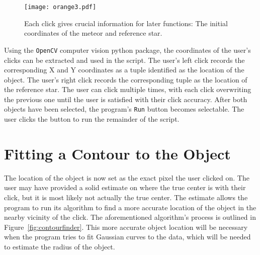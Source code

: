 \begin{figure}[h!]
	\centering
	\texttt{[image: orange3.pdf]}
	\caption{Each click gives crucial information for later functions: The initial coordinates of the meteor and reference star.}
	\label{fig:clickfinder}
\end{figure}

Using the \texttt{OpenCV} computer vision python package, the coordinates of the user's clicks can be extracted and used in the script. The user's left click records the corresponding X and Y coordinates as a tuple identified as the location of the object. The user's right click records the corresponding tuple as the location of the reference star. The user can click multiple times, with each click overwriting the previous one until the user is satisfied with their click accuracy. After both objects have been selected, the program's \texttt{Run} button becomes selectable. The user clicks the button to run the remainder of the script.


\section{Fitting a Contour to the Object}
The location of the object is now set as the exact pixel the user clicked on. The user may have provided a solid estimate on where the true center is with their click, but it is most likely not actually the true center. The estimate allows the program to run its algorithm to find a more accurate location of the object in the nearby vicinity of the click. The aforementioned algorithm's process is outlined in Figure~\ref{fig:contourfinder}. This more accurate object location will be necessary when the program tries to fit Gaussian curves to the data, which will be needed to estimate the radius of the object.

